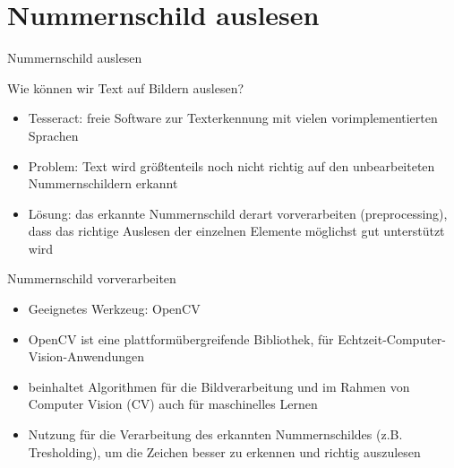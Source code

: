 \section{Nummernschild auslesen}

\begin{frame}{Nummernschild auslesen}

Wie können wir Text auf Bildern auslesen?

\begin{itemize}
\item Tesseract: freie Software zur Texterkennung mit vielen vorimplementierten Sprachen
\item Problem: Text wird größtenteils noch nicht richtig auf den unbearbeiteten Nummernschildern erkannt
\item Lösung: das erkannte Nummernschild derart vorverarbeiten (preprocessing), dass das richtige Auslesen der einzelnen Elemente möglichst gut unterstützt wird
\end{itemize}

\end{frame}

\begin{frame}{Nummernschild vorverarbeiten}

\begin{itemize}
\item Geeignetes Werkzeug: OpenCV
\item OpenCV ist eine plattformübergreifende Bibliothek, für Echtzeit-Computer-Vision-Anwendungen
\item beinhaltet Algorithmen für die Bildverarbeitung und im Rahmen von Computer Vision (CV) auch für maschinelles Lernen
\item Nutzung für die Verarbeitung des erkannten Nummernschildes (z.B. Tresholding), um die Zeichen besser zu erkennen und richtig auszulesen
\end{itemize}

\end{frame}

